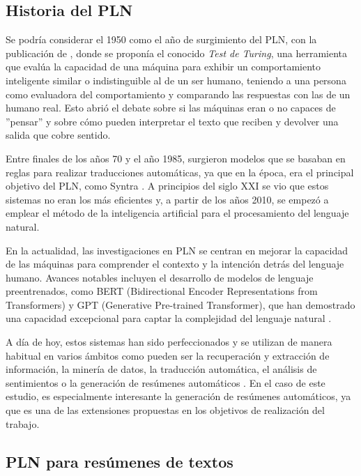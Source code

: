 \subsection{Historia del PLN}

Se podría considerar el 1950 como el año de surgimiento del PLN, con la publicación de \cite{10.1093/mind/LIX.236.433}, donde se proponía el conocido \textit{Test de Turing}, una herramienta que evalúa la capacidad de una máquina para exhibir un comportamiento inteligente similar o indistinguible al de un ser humano, teniendo a una persona como evaluadora del comportamiento y comparando las respuestas con las de un humano real. Esto abrió el debate sobre si las máquinas eran o no capaces de ''pensar'' y sobre cómo pueden interpretar el texto que reciben y devolver una salida que cobre sentido.

Entre finales de los años 70 y el año 1985, surgieron modelos que se basaban en reglas para realizar traducciones automáticas, ya que en la época, era el principal objetivo del PLN, como Syntra \citep{Toma1970SYSTRANMT}. A principios del siglo XXI se vio que estos sistemas no eran los más eficientes y, a partir de los años 2010, se empezó a emplear el método de la inteligencia artificial para el procesamiento del lenguaje natural.

En la actualidad, las investigaciones en PLN se centran en mejorar la capacidad de las máquinas para comprender el contexto y la intención detrás del lenguaje humano. Avances notables incluyen el desarrollo de modelos de lenguaje preentrenados, como BERT (Bidirectional Encoder Representations from Transformers) y GPT (Generative Pre-trained Transformer), que han demostrado una capacidad excepcional para captar la complejidad del lenguaje natural \citep{devlin2019bert}.

A día de hoy, estos sistemas han sido perfeccionados y se utilizan de manera habitual en varios ámbitos como pueden ser la recuperación y extracción de información, la minería de datos, la traducción automática, el análisis de sentimientos o la generación de resúmenes automáticos \citep{hernandez2013aplicaciones}. En el caso de este estudio, es especialmente interesante la generación de resúmenes automáticos, ya que es una de las extensiones propuestas en los objetivos de realización del trabajo.

\subsection{PLN para resúmenes de textos}


